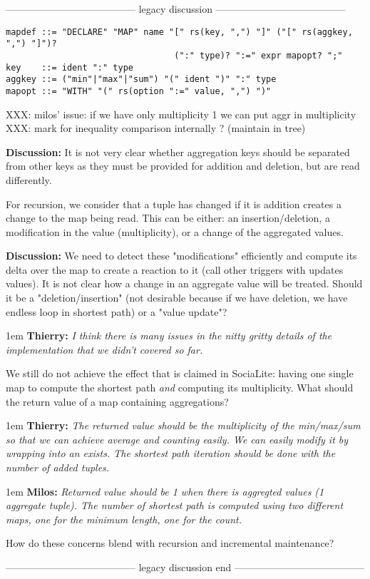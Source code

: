 \documentclass[11pt]{article}
\newlength{\dlen}
\def\discuss#1{\par\hspace{2em}
\setlength{\dlen}{\textwidth}
\addtolength{\dlen}{-2em}
\begin{minipage}{\dlen}\footnotesize {\bf\color{red} Discussion:} #1\end{minipage}\par}
\def\say#1#2{\begingroup\par\leftskip1em {\bf #1:} \it #2\par\endgroup}
\begin{document}
{\center --------------------------------------- legacy discussion ---------------------------------------}
\begin{verbatim}
mapdef ::= "DECLARE" "MAP" name "[" rs(key, ",") "]" ("[" rs(aggkey, ",") "]")? 
                                 (":" type)? ":=" expr mapopt? ";" 
key    ::= ident ":" type
aggkey ::= ("min"|"max"|"sum") "(" ident ")" ":" type
mapopt ::= "WITH" "(" rs(option ":=" value, ",") ")"
\end{verbatim}

{\color{red}
XXX: milos' issue: if we have only multiplicity 1 we can put aggr in multiplicity\\
XXX: mark for inequality comparison internally ? (maintain in tree)
}

\discuss{It is not very clear whether aggregation keys should be separated from other keys as they must be provided for addition and deletion, but are read differently.}
For recursion, we consider that a tuple has changed if it is addition creates a change to the map being read. This can be either: an insertion/deletion, a modification in the value (multiplicity), or a change of the aggregated values.
\discuss{We need to detect these "modifications" efficiently and compute its delta over the map to create a reaction to it (call other triggers with updates values). It is not clear how a change in an aggregate value will be treated. Should it be a "deletion/insertion" (not desirable because if we have deletion, we have endless loop in shortest path) or a "value update"?
	\say{Thierry}{I think there is many issues in the nitty gritty details of the implementation that we didn't covered so far.}
We still do not achieve the effect that is claimed in SociaLite: having one single map to compute the shortest path \textit{and} computing its multiplicity. What should the return value of a map containing aggregations?
	\say{Thierry}{The returned value should be the multiplicity of the min/max/sum so that we can achieve average and counting easily. We can easily modify it by wrapping into an exists. The shortest path iteration should be done with the number of added tuples.}
	\say{Milos}{Returned value should be 1 when there is aggregted values (1 aggregate tuple). The number of shortest path is computed using two different maps, one for the minimum length, one for the count.}
}
How do these concerns blend with recursion and incremental maintenance?

{\center --------------------------------------- legacy discussion end ---------------------------------------}
\end{document}
